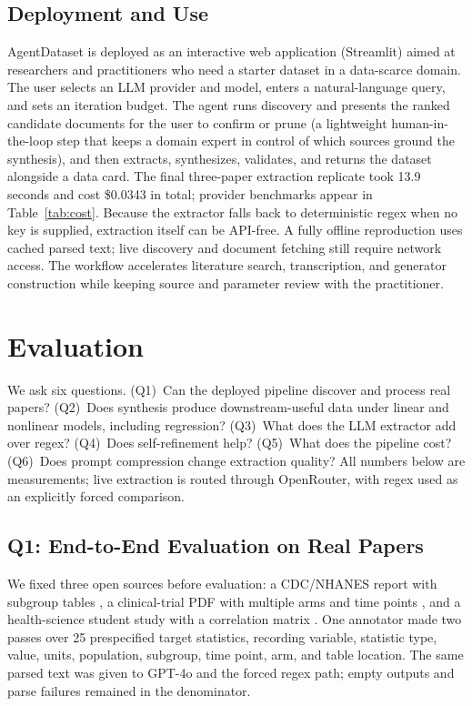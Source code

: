\documentclass[letterpaper]{article} %
\begin{document}
\subsection{Deployment and Use}
AgentDataset is deployed as an interactive web application (Streamlit) aimed at
researchers and practitioners who need a starter dataset in a data-scarce
domain. The user selects an LLM provider and model, enters a natural-language
query, and sets an iteration budget. The agent runs discovery and presents the
ranked candidate documents for the user to confirm or prune (a lightweight
human-in-the-loop step that keeps a domain expert in control of which sources
ground the synthesis), and then extracts, synthesizes, validates, and returns
the dataset alongside a data card. The final three-paper extraction replicate
took 13.9 seconds and cost \$0.0343 in total; provider benchmarks appear in
Table~\ref{tab:cost}. Because the extractor falls back to deterministic regex
when no key is supplied, extraction itself can be API-free. A fully offline
reproduction uses cached parsed text; live discovery and document fetching
still require network access. The workflow accelerates literature search,
transcription, and generator construction while keeping source and parameter
review with the practitioner.

\section{Evaluation}
\label{sec:eval}

We ask six questions. (Q1)~Can the deployed pipeline discover and process real
papers? (Q2)~Does synthesis produce downstream-useful data under linear and
nonlinear models, including regression? (Q3)~What does the LLM extractor add
over regex? (Q4)~Does self-refinement help? (Q5)~What does the pipeline cost?
(Q6)~Does prompt compression change extraction quality?
All numbers below are measurements; live extraction is routed through
OpenRouter, with regex used as an explicitly forced comparison.

\subsection{Q1: End-to-End Evaluation on Real Papers}
We fixed three open sources before evaluation: a CDC/NHANES report with subgroup
tables \citep{fan2014rural}, a clinical-trial PDF with multiple arms and time
points \citep{meydani2016calerie}, and a health-science student study with a
correlation matrix \citep{linh2026smartphone}. One annotator made two passes
over 25 prespecified target statistics, recording variable, statistic type,
value, units, population, subgroup, time point, arm, and table location. The
same parsed text was given to GPT-4o and the forced regex path; empty outputs
and parse failures remained in the denominator.
\end{document}
